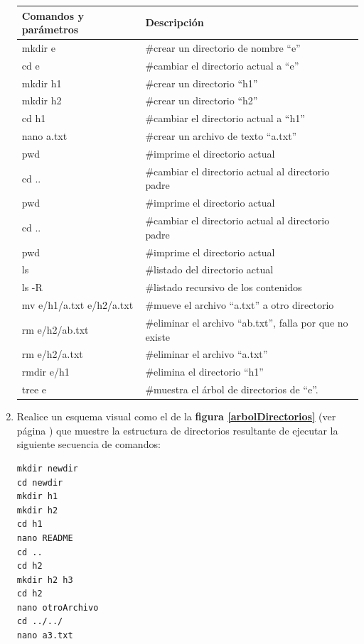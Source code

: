 \documentclass[12pt]{article}
\begin{document}
\begin{enumerate}[resume]
\begin{center}
    \begin{tabular}[t]{l l }
    \hline
        \textbf{Comandos y parámetros} & \textbf{Descripción} \\
    \hline
    \hline
        mkdir e &  \#crear un directorio de nombre ``e'' \\
        cd e &  \#cambiar el directorio actual a ``e'' \\
        mkdir h1 &  \#crear un directorio ``h1'' \\
        mkdir h2 &  \#crear un directorio ``h2'' \\
        cd h1 &  \#cambiar el directorio actual a ``h1'' \\
        nano a.txt &  \#crear un archivo de texto ``a.txt''\\
        pwd &  \#imprime el directorio actual\\
        cd .. &  \#cambiar el directorio actual al directorio padre \\
        pwd &  \#imprime el directorio actual \\
        cd .. &  \#cambiar el directorio actual al directorio padre \\
        pwd &  \#imprime el directorio actual \\
        ls &  \#listado del directorio actual \\
        ls -R &  \#listado recursivo de los contenidos \\
        mv e/h1/a.txt e/h2/a.txt &  \#mueve el archivo ``a.txt'' a otro directorio \\
        rm e/h2/ab.txt &  \#eliminar el archivo ``ab.txt'', falla por que no
        existe\\
        rm e/h2/a.txt &  \#eliminar el archivo ``a.txt'' \\
        rmdir e/h1 &  \#elimina el directorio ``h1'' \\
        tree e & \#muestra el árbol de directorios de ``e''.\\
    \hline
    \end{tabular}

\end{center}

    \item Realice un esquema visual como el de la \textbf{figura
        \ref{arbolDirectorios}} (ver página \pageref{arbolDirectorios}) que
        muestre la estructura de directorios resultante de ejecutar la
        siguiente secuencia de comandos:

        \begin{verbatim}
mkdir newdir
cd newdir
mkdir h1
mkdir h2
cd h1
nano README
cd ..
cd h2
mkdir h2 h3
cd h2
nano otroArchivo
cd ../../
nano a3.txt
        \end{verbatim}


\end{enumerate}
\end{document}
